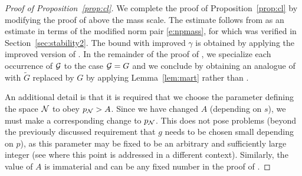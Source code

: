 \begin{proof}[Proof of Proposition~\ref{prop:cl}]
We complete the proof of Proposition~\ref{prop:cl} by modifying the proof of
\cite[Proposition~\ref{IE-prop:cl}]{BS-rg-IE} above the mass scale.
The estimate \cite[\eqref{IE-e:Lkpfii-1zbis}]{BS-rg-IE}
follows from \cite[Proposition~\ref{IE-prop:ip}]{BS-rg-IE}
as an estimate in terms of the modified norm pair \eqref{e:npmass},
for which \cite[Proposition~\ref{IE-prop:ip}]{BS-rg-IE} was verified in Section~\ref{sec:stability2}.
The bound \cite[\eqref{IE-e:cl-1}]{BS-rg-IE} with improved $\gamma$ is obtained by applying the improved
version of \cite[Proposition~\ref{IE-prop:1-LTdefXY}]{BS-rg-IE}. In the remainder
of the proof of \cite[Proposition~\ref{IE-prop:cl}]{BS-rg-IE}, we specialize each
occurrence of $\mathcal{G}$ to the case $\mathcal{G} = G$ and we conclude by obtaining an
analogue of \cite[\eqref{IE-e:FXbdKzzz}]{BS-rg-IE} with $\tilde G$ replaced by
$G$ by applying Lemma~\ref{lem:mart} rather than \cite[Lemma~\ref{IE-lem:mart}]{BS-rg-IE}.

An additional detail is that it is required that we choose the parameter defining the space $\mathcal{N}$ to
obey $p_{\mathcal{N}} >A$.
Since we have changed $A$ (depending on $s$), we must make a corresponding change to $p_{\mathcal{N}}$. This does not pose problems
(beyond the previously discussed requirement that $g$ needs to be chosen small depending on $p$),
as this parameter may be
fixed to be an arbitrary and sufficiently large integer
(see \cite[Section~\ref{phi4-sec:pNcal}]{ST-phi4} where this point is addressed
in a different context).  Similarly, the value of $A$ is immaterial and can be
any fixed number in the proof of
\cite[Proposition \ref{IE-prop:cl}]{BS-rg-IE}.
\end{proof}
